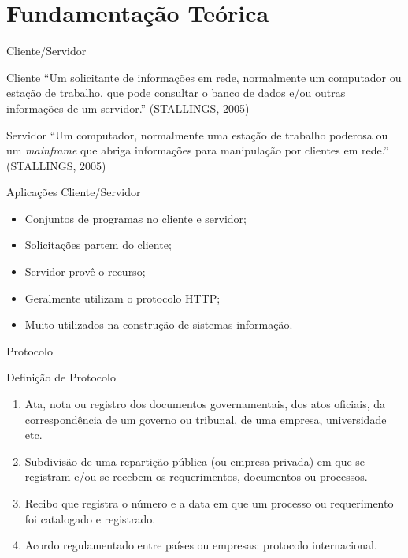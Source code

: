 \section{Fundamentação Teórica}\label{sec:fundamentacao-teorica}

\begin{frame}{Cliente/Servidor}
	\begin{block}{Cliente}
		``Um solicitante de informações em rede, normalmente um computador ou 
		estação de trabalho, que pode consultar o banco de dados e/ou outras 
		informações de um servidor.'' (STALLINGS, 2005)
	\end{block}
	\begin{block}{Servidor}
		``Um computador, normalmente uma estação de trabalho poderosa ou um 
		\textit{mainframe} que abriga informações para manipulação por clientes 
		em rede.'' (STALLINGS, 2005)
	\end{block}
\end{frame}
\begin{frame}{Aplicações Cliente/Servidor}
	\begin{itemize}
		\item Conjuntos de programas no cliente e servidor; \pause
		\item Solicitações partem do cliente; \pause
		\item Servidor provê o recurso; \pause
		\item Geralmente utilizam o protocolo HTTP; \pause
		\item Muito utilizados na construção de sistemas informação.
	\end{itemize}
\end{frame}


\begin{frame}{Protocolo}
	\begin{block}{Definição de Protocolo}
		\begin{enumerate}
			\item Ata, nota ou registro dos documentos governamentais, dos 
			atos oficiais, da correspondência de um governo ou tribunal, de uma 
			empresa, universidade etc.
			\item Subdivisão de uma repartição pública (ou empresa privada) em 
			que se registram e/ou se recebem os requerimentos, documentos ou 
			processos.
			\item Recibo que registra o número e a data em que um processo ou 
			requerimento foi catalogado e registrado.
			\item Acordo regulamentado entre países ou empresas: protocolo 
			internacional.
		\end{enumerate}
	\end{block}
\end{frame}


